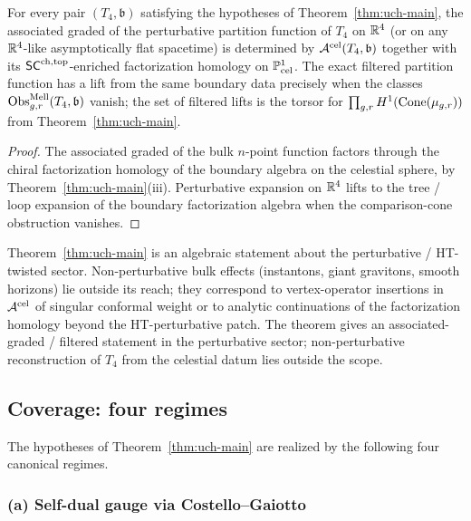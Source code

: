 \begin{corollary}
\label{cor:uch-bulk-recovery}
For every pair $(T_4,\mathfrak b)$ satisfying the hypotheses of
Theorem~\ref{thm:uch-main}, the associated graded of the perturbative
partition function of $T_4$ on $\mathbb R^4$ (or on any $\mathbb R^4$-like
asymptotically flat spacetime) is determined by
$\mathcal A^{\mathrm{cel}}(T_4,\mathfrak b)$ together with its
$\mathsf{SC}^{\mathrm{ch,top}}$-enriched factorization homology on $\mathbb P^1_{\text{cel}}$.
The exact filtered partition function has a lift from the same
boundary data precisely when the classes
$\operatorname{Obs}^{\mathrm{Mell}}_{g,r}(T_4,\mathfrak b)$ vanish; the set of
filtered lifts is the torsor for
\(\prod_{g,r}H^1(\operatorname{Cone}(\mu_{g,r}))\) from
Theorem~\ref{thm:uch-main}.
\end{corollary}

\begin{proof}
The associated graded of the bulk $n$-point function factors through
the chiral factorization homology of the boundary algebra on the
celestial sphere, by Theorem~\ref{thm:uch-main}(iii). Perturbative
expansion on $\mathbb R^4$ lifts to the tree / loop expansion of the
boundary factorization algebra when the comparison-cone obstruction
vanishes.
\end{proof}

\begin{remark}
\label{rem:uch-scope}
Theorem~\ref{thm:uch-main} is an algebraic statement about the
perturbative / HT-twisted sector. Non-perturbative bulk effects
(instantons, giant gravitons, smooth horizons) lie outside its reach;
they correspond to vertex-operator insertions in $\mathcal A^{\mathrm{cel}}$
of singular conformal weight or to analytic continuations of the
factorization homology beyond the HT-perturbative patch. The theorem
gives an associated-graded / filtered statement in the
perturbative sector; non-perturbative reconstruction of $T_4$ from the
celestial datum lies outside the scope.
\end{remark}

\subsection{Coverage: four regimes}
\label{subsec:uch-coverage}

The hypotheses of Theorem~\ref{thm:uch-main} are realized by the
following four canonical regimes.

\subsubsection*{(a) Self-dual gauge via Costello--Gaiotto}

